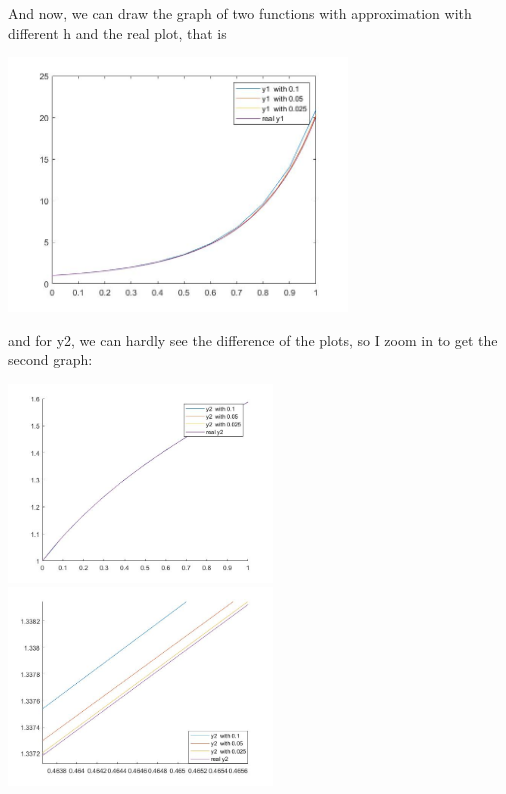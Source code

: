 \documentclass{article}
\begin{document}
\begin{enumerate}
\begin{enumerate}
And now, we can draw the graph of two functions with approximation with different h and the real plot, that is 
\begin{center}
  \includegraphics[width=9cm]{y1_trap.jpg} 
 \end{center}
 
 and for y2, we can hardly see the difference of the plots, so I zoom in to get the second graph:
 \begin{center}
  \includegraphics[width=7cm]{y2_trap.jpg} 
   \includegraphics[width=7cm]{y2_trap_zoom.jpg} 
 \end{center}
 

\end{enumerate}
\end{enumerate}
\end{document}
